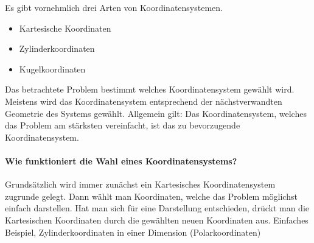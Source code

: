\newpage
\begin{importantbox}
Es gibt vornehmlich drei Arten von Koordinatensystemen. 
\begin{itemize}
	\item Kartesische Koordinaten
	\item Zylinderkoordinaten
	\item Kugelkoordinaten
\end{itemize}
Das betrachtete Problem bestimmt welches Koordinatensystem gewählt wird. Meistens wird das Koordinatensystem entsprechend der nächstverwandten Geometrie des Systems gewählt. Allgemein gilt: Das Koordinatensystem, welches das Problem am stärksten vereinfacht, ist das zu bevorzugende Koordinatensystem.

\paragraph{Wie funktioniert die Wahl eines Koordinatensystems?}
Grundsätzlich wird immer zunächst ein Kartesisches Koordinatensystem zugrunde gelegt. Dann wählt man Koordinaten, welche das Problem möglichst einfach darstellen. Hat man sich für eine Darstellung entschieden, drückt man die Kartesischen Koordinaten durch die gewählten neuen Koordinaten aus.
Einfaches Beispiel, Zylinderkoordinaten in einer Dimension (Polarkoordinaten)\newline
\begin{multicols}{2} %
\end{multicols}
\end{importantbox}
